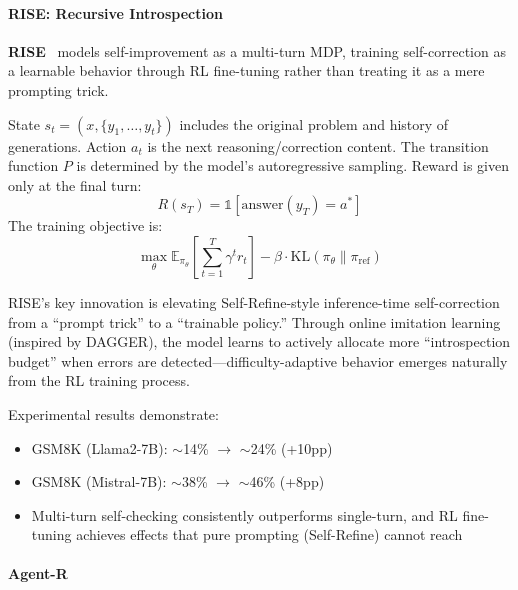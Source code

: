 \paragraph{RISE: Recursive Introspection}

\textbf{RISE}~\citep{rise2024} models self-improvement as a multi-turn MDP, training self-correction as a learnable behavior through RL fine-tuning rather than treating it as a mere prompting trick.

\begin{definition}
State $s_t = (x, \{y_1, \ldots, y_t\})$ includes the original problem and history of generations. Action $a_t$ is the next reasoning/correction content. The transition function $P$ is determined by the model's autoregressive sampling. Reward is given only at the final turn:
\begin{equation}
R(s_T) = \mathbb{1}[\text{answer}(y_T) = a^*]
\label{eq:rise-reward}
\end{equation}
The training objective is:
\begin{equation}
\max_\theta \mathbb{E}_{\pi_\theta}\left[\sum_{t=1}^{T} \gamma^t r_t\right] - \beta \cdot \mathrm{KL}(\pi_\theta \| \pi_{\mathrm{ref}})
\label{eq:rise-objective}
\end{equation}
\end{definition}

RISE's key innovation is elevating Self-Refine-style inference-time self-correction from a ``prompt trick'' to a ``trainable policy.'' Through online imitation learning (inspired by DAGGER), the model learns to actively allocate more ``introspection budget'' when errors are detected---difficulty-adaptive behavior emerges naturally from the RL training process.

Experimental results demonstrate:
\begin{itemize}
\item GSM8K (Llama2-7B): $\sim$14\% $\rightarrow$ $\sim$24\% (+10pp)
\item GSM8K (Mistral-7B): $\sim$38\% $\rightarrow$ $\sim$46\% (+8pp)
\item Multi-turn self-checking consistently outperforms single-turn, and RL fine-tuning achieves effects that pure prompting (Self-Refine) cannot reach
\end{itemize}

\paragraph{Agent-R}

